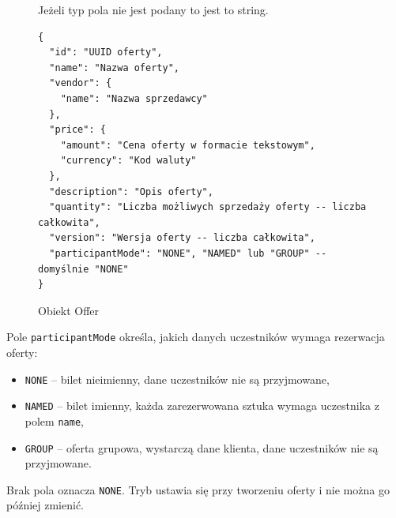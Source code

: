 \begin{figure}[H]
\label{schema:offer}
Jeżeli typ pola nie jest podany to jest to string.
\begin{verbatim}
{
  "id": "UUID oferty",
  "name": "Nazwa oferty",
  "vendor": {
    "name": "Nazwa sprzedawcy"
  },
  "price": {
    "amount": "Cena oferty w formacie tekstowym",
    "currency": "Kod waluty"
  },
  "description": "Opis oferty",
  "quantity": "Liczba możliwych sprzedaży oferty -- liczba całkowita",
  "version": "Wersja oferty -- liczba całkowita",
  "participantMode": "NONE", "NAMED" lub "GROUP" -- domyślnie "NONE"
}
\end{verbatim}
\caption{Obiekt Offer}
\end{figure}

Pole \texttt{participantMode} określa, jakich danych uczestników wymaga rezerwacja oferty:
\begin{itemize}
  \item \texttt{NONE} -- bilet nieimienny, dane uczestników nie są przyjmowane,
  \item \texttt{NAMED} -- bilet imienny, każda zarezerwowana sztuka wymaga uczestnika
    z polem \texttt{name},
  \item \texttt{GROUP} -- oferta grupowa, wystarczą dane klienta, dane uczestników nie są przyjmowane.
\end{itemize}
Brak pola oznacza \texttt{NONE}.
Tryb ustawia się przy tworzeniu oferty i nie można go później zmienić.
